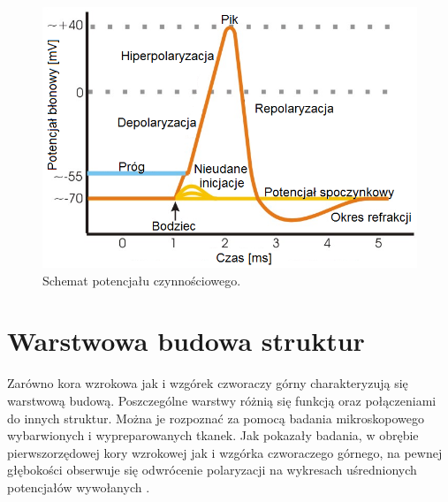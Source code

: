 \documentclass{pracamgr}
\begin{document}
	\begin{figure}[htbp]
		\begin{center}
			\includegraphics[scale=0.5]{pot_spoczy.png}
		\end{center}
		\caption{Schemat potencjału czynnościowego.}
		\label{rys:pot_spoczy}
	\end{figure}
	\newpage
	\section{Warstwowa budowa struktur}
	Zarówno kora wzrokowa jak i wzgórek czworaczy górny charakteryzują się warstwową budową. Poszczególne warstwy różnią się funkcją oraz połączeniami do innych struktur. 
	Można je rozpoznać za pomocą badania mikroskopowego wybarwionych i wypreparowanych tkanek. Jak pokazały badania, w obrębie pierwszorzędowej kory wzrokowej jak i wzgórka czworaczego górnego, na pewnej głębokości obserwuje się odwrócenie polaryzacji na wykresach uśrednionych potencjałów wywołanych \citep{maier2, SC_warstwy}.
\end{document}
